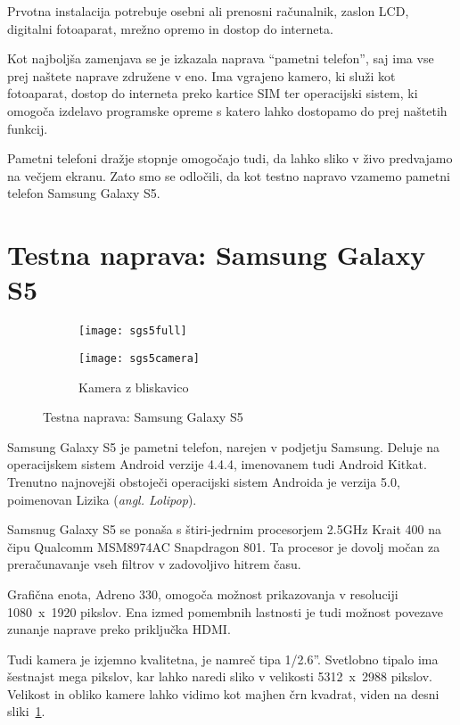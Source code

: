 Prvotna instalacija potrebuje osebni ali prenosni računalnik, zaslon LCD,
digitalni fotoaparat, mrežno opremo in dostop do interneta.

Kot najboljša zamenjava se je izkazala naprava ``pametni telefon'', saj ima vse prej naštete naprave združene v eno. Ima vgrajeno kamero, ki služi kot fotoaparat, dostop do interneta preko kartice SIM ter operacijski sistem, ki
omogoča izdelavo programske opreme s katero lahko dostopamo do prej naštetih funkcij.

Pametni telefoni dražje stopnje omogočajo tudi, da lahko sliko v živo predvajamo na večjem ekranu. Zato smo se odločili, da kot testno napravo vzamemo pametni telefon Samsung Galaxy S5.

\section{Testna naprava: Samsung Galaxy S5}

\begin{figure}[!ht]
    \centering
    \begin{subfigure}[b]{0.4\textwidth}
        \texttt{[image: sgs5full]}
    \end{subfigure}
    \begin{subfigure}[b]{0.4\textwidth}
        \texttt{[image: sgs5camera]}
        \caption{Kamera z bliskavico}
    \end{subfigure}
    \caption{Testna naprava: Samsung Galaxy S5}
    \label{fig:sgs5}
\end{figure}

Samsung Galaxy S5 je pametni telefon, narejen v podjetju Samsung. Deluje na operacijskem sistem Android verzije 4.4.4, imenovanem tudi Android Kitkat.
Trenutno najnovejši obstoječi operacijski sistem Androida je verzija 5.0, poimenovan Lizika (\textit{angl. Lolipop}).

Samsnug Galaxy S5 se ponaša s štiri-jedrnim procesorjem 2.5GHz Krait 400 na čipu Qualcomm MSM8974AC Snapdragon 801. Ta procesor je dovolj močan za preračunavanje vseh filtrov v zadovoljivo hitrem času.

Grafična enota, Adreno 330, omogoča možnost prikazovanja v resoluciji 1080~x~1920 pikslov. Ena izmed pomembnih lastnosti je tudi možnost povezave zunanje naprave preko priključka HDMI.

Tudi kamera je  izjemno kvalitetna, je namreč tipa 1/2.6''. Svetlobno tipalo ima šestnajst mega pikslov, kar lahko naredi sliko v velikosti 5312~x~2988 pikslov. Velikost in obliko kamere lahko vidimo kot majhen črn kvadrat, viden na
desni sliki~\ref{fig:sgs5}.

